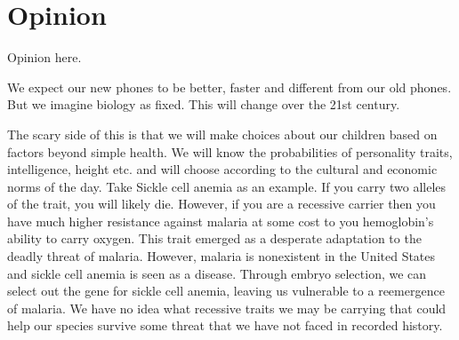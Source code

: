 \section{Opinion}
\label{sec:opinion}

Opinion here.

We expect our new phones to be better, faster and different from our old phones.
But we imagine biology as fixed.
This will change over the 21st century.

The scary side of this is that we will make choices about our children based on factors beyond simple health.
We will know the probabilities of personality traits, intelligence, height etc. and will choose according to the cultural and economic norms of the day.
Take Sickle cell anemia as an example.
If you carry two alleles of the trait, you will likely die.
However, if you are a recessive carrier then you have much higher resistance against malaria at some cost to you hemoglobin's ability to carry oxygen.
This trait emerged as a desperate adaptation to the deadly threat of malaria.
However, malaria is nonexistent in the United States and sickle cell anemia is seen as a disease.
Through embryo selection, we can select out the gene for sickle cell anemia, leaving us vulnerable to a reemergence of malaria.
We have no idea what recessive traits we may be carrying that could help our species survive some threat that we have not faced in recorded history.